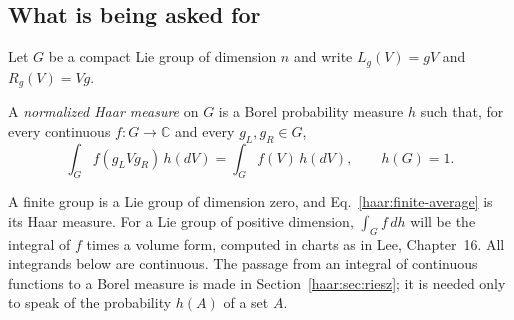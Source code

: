 \subsection{What is being asked for}
Let $G$ be a compact Lie group of dimension $n$ and write
$L_g(V)=gV$ and $R_g(V)=Vg$.
\begin{definition}\label{haar:def:haar}
A \emph{normalized Haar measure} on $G$ is a Borel probability measure $h$
such that, for every continuous $f\colon G\to\mathbb C$ and every
$g_L,g_R\in G$,
\begin{equation}\label{haar:bi-invariance}
 \int_G f(g_LVg_R)\,h(dV)=\int_G f(V)\,h(dV),\qquad h(G)=1.
\end{equation}
\end{definition}
A finite group is a Lie group of dimension zero, and
Eq.~\eqref{haar:finite-average} is its Haar measure. For a Lie group of
positive dimension, $\int_G f\,dh$ will be the integral of $f$ times a
volume form, computed in charts as in Lee, Chapter~16. All integrands below
are continuous. The passage from an integral of continuous functions to a
Borel measure is made in Section~\ref{haar:sec:riesz}; it is needed only to
speak of the probability $h(A)$ of a set $A$.

